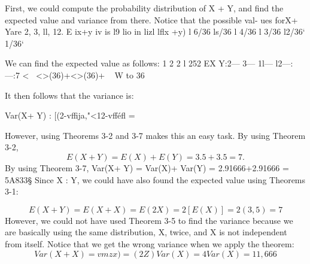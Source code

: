 First, we could compute the probability distribution of X + Y, and ﬁnd
the expected value and variance from there. Notice that the possible val-
ues forX+ Yare 2, 3,  ll, 12.
E
ix+y iv is l9 lio in lizl
lﬂx +y) l 6/36 ls/36 l 4/36 l 3/36 l2/36‘ 1/36‘

We can ﬁnd the expected value as follows:
1 2 2 l 252
EX Y:2— 3— 1l— l2—:—:7
<~ <>(36)+<>(36)+ ~ W to 36

It then follows that the variance is:

Var(X+ Y) : [(2-vffija,"<12-vfféﬂ = %



However, using Theorems 3-2 and 3-7 makes this an easy task.
By using Theorem 3-2,
\[E(X+ Y) = E(X) + E(Y) = 3.5 + 3.5 = 7.\]
By using Theorem 3-7,
Var(X+ Y) = Var(X)+ Var(Y) = 2.91666+2.91666 = 5A833§
Since X : Y, we could have also found the expected value using
Theorems 3-1:

\[E(X + Y) = E(X + X) = E(2X) = 2[E(X)] = 2(3,5) = 7\]
However, we could not have used Theorem 3-5 to ﬁnd the variance
because we are basically using the same distribution, X, twice, and X is
not independent from itself. Notice that we get the wrong variance when
we apply the theorem:
\[Var(X + X) = vmzx) = (2Z)Var(X) = 4Var(X) = 11,666\]

